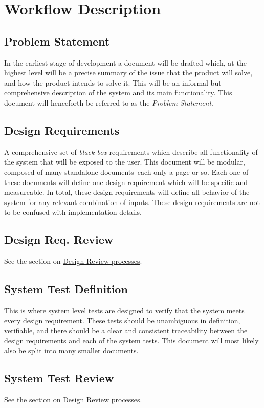 \documentclass[12pt]{article}
\begin{document}
\section{Workflow Description}
\subsection{Problem Statement}
In the earliest stage of development a document will be drafted which, at the
highest level will be a precise summary of the issue that the product will
solve, and how the product intends to solve it. This will be an informal but
comprehensive description of the system and its main functionality. This
document will henceforth be referred to as the {\it Problem Statement}.

\subsection{Design Requirements}
A comprehensive set of {\it black box} requirements which describe all
functionality of the system that will be exposed to the user. This document
will be modular, composed of many standalone documents--each only a page or so.
Each one of these documents will define one design requirement which will be
specific and measureable. In total, these design requirements will define all
behavior of the system for any relevant combination of inputs. These design
requirements are not to be confused with implementation details.

\subsection{Design Req. Review}
See the section on \hyperref[sec:review]{Design Review processes}.
\pagebreak

\subsection{System Test Definition}
This is where system level tests are designed to verify that the system meets
every design requirement. These tests should be unambiguous in definition,
verifiable, and there should be a clear and consistent traceability between
the design requirements and each of the system tests. This document will most
likely also be split into many smaller documents.

\subsection{System Test Review}
See the section on \hyperref[sec:review]{Design Review processes}.
\end{document}
